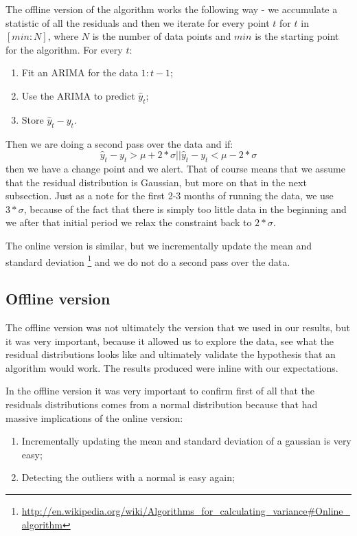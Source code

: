 \documentclass[minf,twoside,singlespacing,parskip,notimes,deptreport]{infthesis} %
\begin{document}
The offline version of the algorithm works the following way - we accumulate a statistic of all the residuals and then we iterate for every point $t$ for $t$ in $[min:N]$, where $N$ is the number of data points and  $min$ is the starting point for the algorithm. For every $t$:
\begin{enumerate}
\item Fit an ARIMA for the data $1:t-1$;
\item Use the ARIMA to predict $\hat{y}_t$; 
\item Store $\hat{y}_t  - y_t$.
\end{enumerate}

Then we are doing a second pass over the data and if:
\begin{equation}
\hat{y}_t  - y_t> \mu + 2*\sigma || \hat{y}_t  - y_t < \mu - 2*\sigma
\end{equation}
then we have a change point and we alert. That of course means that we assume that the residual distribution is Gaussian, but more on that in the next subsection. Just as a note for the first 2-3 months of running the data, we use $3*\sigma$, because of the fact that there is simply too little data in the beginning and we after that initial period we relax the constraint back to $2*\sigma$.

The online version is similar, but we incrementally update the mean and standard deviation \footnote{\url{http://en.wikipedia.org/wiki/Algorithms\_for\_calculating\_variance#Online\_algorithm}} and we do not do a second pass over the data. 

\subsection{Offline version}

The offline version was not ultimately the version that we used in our results, but it was very important, because it allowed us to explore the data, see what the residual distributions looks like and ultimately validate the hypothesis that an algorithm would work. The results produced were inline with our expectations.  

In the offline version it was very important to confirm first of all that the residuals distributions comes from a normal distribution because that had massive implications of the online version:
\begin{enumerate}
\item Incrementally updating the mean and standard deviation of a gaussian is very easy;
\item Detecting the outliers with a normal is easy again;
\end{enumerate}
\end{document}
